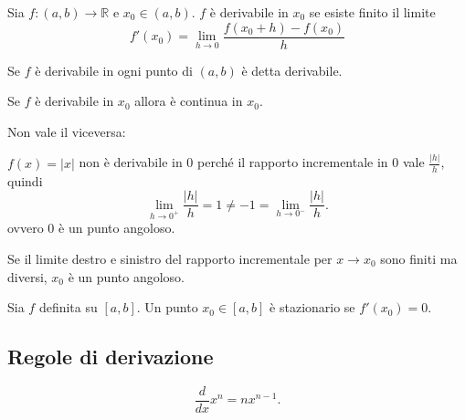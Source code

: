 \begin{definition}[Derivata]
    Sia $f\colon (a,b)\rightarrow\mathbb R$ e $x_0\in(a,b)$. $f$ è derivabile in $x_0$ se esiste finito il limite
    \begin{equation}\label{eq:limite_rapporto_incrementale}
        f'(x_0)=\lim_{h\rightarrow 0}\frac{f(x_0+h)-f(x_0)}{h}
    \end{equation}
\end{definition}

\begin{definition}
    Se $f$ è derivabile in ogni punto di $(a,b)$ è detta derivabile.
\end{definition}

\begin{theorem}
    Se $f$ è derivabile in $x_0$ allora è continua in $x_0$.
\end{theorem}

Non vale il viceversa:
\begin{example}
    $f(x)=|x|$ non è derivabile in 0 perché il rapporto incrementale in 0 vale $\frac{|h|}{h}$, quindi
    \begin{equation*}
        \lim_{h\rightarrow 0^+}\frac{|h|}{h}=1\neq -1=\lim_{h\rightarrow 0^-}\frac{|h|}{h}.
    \end{equation*}
    ovvero 0 è un punto angoloso.
\end{example}

\begin{definition}
    Se il limite destro e sinistro del rapporto incrementale per $x\rightarrow x_0$ sono finiti ma diversi, $x_0$ è un punto angoloso.
\end{definition}

\begin{definition}
    Sia $f$ definita su $[a,b]$. Un punto $x_0\in[a,b]$ è stazionario se $f'(x_0)=0$.
\end{definition}

\subsection{Regole di derivazione}

\begin{theorem}
    \begin{equation*}
        \frac{d}{dx}x^n=nx^{n-1}.
    \end{equation*}
\end{theorem}

